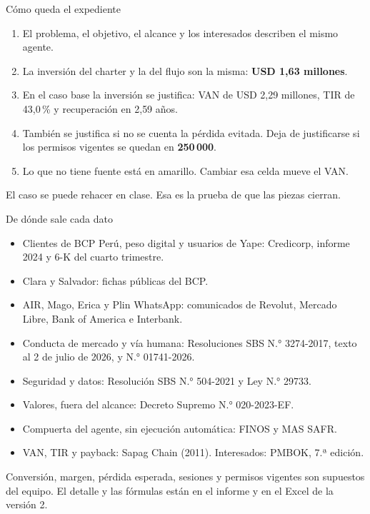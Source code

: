 \documentclass[aspectratio=169,11pt]{beamer}
\begin{document}
\begin{frame}{Cómo queda el expediente}
\vspace{0.15cm}
\begin{enumerate}
\setlength{\itemsep}{0.18em}
  \item El problema, el objetivo, el alcance y los interesados describen el mismo agente.
  \item La inversión del charter y la del flujo son la misma: \textbf{USD 1{,}63 millones}.
  \item En el caso base la inversión se justifica: VAN de USD 2{,}29 millones, TIR de 43{,}0\,\% y recuperación en 2{,}59 años.
  \item También se justifica si no se cuenta la pérdida evitada. Deja de justificarse si los permisos vigentes se quedan en \textbf{250\,000}.
  \item Lo que no tiene fuente está en amarillo. Cambiar esa celda mueve el VAN.
\end{enumerate}
\vspace{0.3cm}
\begin{center}
{\color{bcp} El caso se puede rehacer en clase. Esa es la prueba de que las piezas cierran.}
\end{center}
\end{frame}

\begin{frame}{De dónde sale cada dato}
\vspace{0.0cm}
{\footnotesize
\begin{itemize}
\setlength{\itemsep}{0.1em}
  \item Clientes de BCP Perú, peso digital y usuarios de Yape: Credicorp, informe 2024 y 6-K del cuarto trimestre.
  \item Clara y Salvador: fichas públicas del BCP.
  \item AIR, Mago, Erica y Plin WhatsApp: comunicados de Revolut, Mercado Libre, Bank of America e Interbank.
  \item Conducta de mercado y vía humana: Resoluciones SBS N.° 3274-2017, texto al 2 de julio de 2026, y N.° 01741-2026.
  \item Seguridad y datos: Resolución SBS N.° 504-2021 y Ley N.° 29733.
  \item Valores, fuera del alcance: Decreto Supremo N.° 020-2023-EF.
  \item Compuerta del agente, sin ejecución automática: FINOS y MAS SAFR.
  \item VAN, TIR y payback: Sapag Chain (2011). Interesados: PMBOK, 7.ª edición.
\end{itemize}}
\vspace{0.06cm}
{\scriptsize\color{muted} Conversión, margen, pérdida esperada, sesiones y permisos vigentes son supuestos del equipo. El detalle y las fórmulas están en el informe y en el Excel de la versión 2.}
\end{frame}
\end{document}
